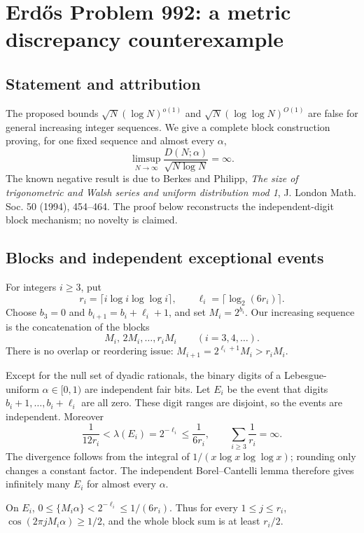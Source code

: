 \section*{Erd\H{o}s Problem 992: a metric discrepancy counterexample}
\subsection*{Statement and attribution}
The proposed bounds $\sqrt N(\log N)^{o(1)}$ and
$\sqrt N(\log\log N)^{O(1)}$ are false for general increasing integer sequences.
We give a complete block construction proving, for one fixed sequence and almost every $\alpha$,
\[
 \limsup_{N\to\infty}\frac{D(N;\alpha)}{\sqrt{N\log N}}=\infty.
\]
The known negative result is due to Berkes and Philipp, \emph{The size of trigonometric and Walsh series and uniform distribution mod 1}, J. London Math. Soc. 50 (1994), 454--464. The proof below reconstructs the independent-digit block mechanism; no novelty is claimed.

\subsection*{Blocks and independent exceptional events}
For integers $i\ge3$, put
\[
 r_i=\lceil i\log i\log\log i\rceil,\qquad
 \ell_i=\lceil\log_2(6r_i)\rceil.
\]
Choose $b_3=0$ and $b_{i+1}=b_i+\ell_i+1$, and set $M_i=2^{b_i}$.
Our increasing sequence is the concatenation of the blocks
\[
 M_i,\,2M_i,\ldots,r_iM_i\qquad(i=3,4,\ldots).
\]
There is no overlap or reordering issue: $M_{i+1}=2^{\ell_i+1}M_i>r_iM_i$.

Except for the null set of dyadic rationals, the binary digits of a Lebesgue-uniform $\alpha\in[0,1)$ are independent fair bits. Let $E_i$ be the event that digits
$b_i+1,\ldots,b_i+\ell_i$ are all zero.
These digit ranges are disjoint, so the events are independent. Moreover
\[
 \frac1{12r_i}<\lambda(E_i)=2^{-\ell_i}\le\frac1{6r_i},
 \qquad
 \sum_{i\ge3}\frac1{r_i}=\infty.
\]
The divergence follows from the integral of $1/(x\log x\log\log x)$; rounding only changes a constant factor.
The independent Borel--Cantelli lemma therefore gives infinitely many $E_i$ for almost every $\alpha$.

On $E_i$, $0\le\{M_i\alpha\}<2^{-\ell_i}\le1/(6r_i)$.
Thus for every $1\le j\le r_i$,
$\cos(2\pi jM_i\alpha)\ge1/2$, and the whole block sum is at least $r_i/2$.

